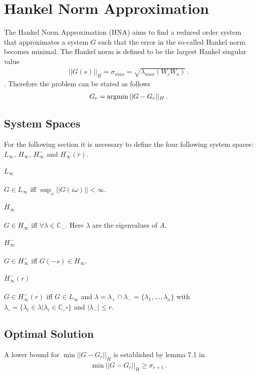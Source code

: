 \section{Hankel Norm Approximation}
The Hankel Norm Approximation (HNA) aims to find a reduced order system that approximates a system \(G\) such that the error in the so-called Hankel norm becomes minimal.
The Hankel norm is defined to be the largest Hankel singular value \cite{singh}
\begin{gather}
||G(s)||_H = \sigma_{max} = \sqrt{\lambda_{max}(W_cW_o)} \,.
\end{gather}.
Therefore the problem can be stated as follows
\begin{gather}
G_r = \operatorname*{argmin} ||G - G_r||_H \,. \label{hna-prob}
\end{gather}
\subsection{System Spaces}
For the following section it is necessary to define the four following system spaces: \(L_{\infty}\), \(H_{\infty}\), \(H_{\infty}^-\) and \(H_{\infty}^-(r)\).
\paragraph{\(L_{\infty}\)}
\(G \in L_{\infty}\) iff  \(\sup_{\omega}||G(i\omega)|| < \infty\).
\paragraph{\(H_{\infty}\)}
\(G \in H_{\infty}\) iff  \(\forall \lambda \in \mathbb{C}_{-}\).
Here \(\lambda\) are the eigenvalues of \(A\).
\paragraph{\(H_{\infty}^-\)}
\(G \in H_{\infty}^-\) iff \(G(-s) \in H_{\infty}\).
\paragraph{\(H_{\infty}^-(r)\)}
\(G \in H_{\infty}^-(r)\) iff \(G \in L_{\infty}\) and 
\(\lambda = \lambda_+ \cap \lambda_- = \{\lambda_1, ..., \lambda_n \}\) with \(\lambda_{\circ} = \{\lambda_i \in \lambda | \lambda_i \in \mathbb{C}\_{\circ}\}\) and \(|\lambda_-| \leq r\).


\subsection{Optimal Solution}
A lower bound for \(\min ||G - G_r||_H\) is established by lemma 7.1 in \cite{glover84}
\begin{gather}
\min ||G - G_r||_H \geq \sigma_{r+1} \,.
\end{gather}

